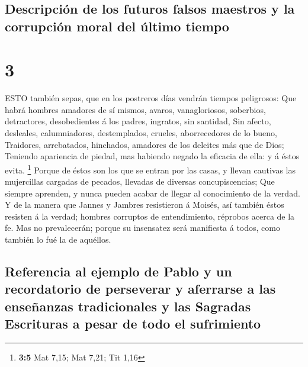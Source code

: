\hypertarget{descripciuxf3n-de-los-futuros-falsos-maestros-y-la-corrupciuxf3n-moral-del-uxfaltimo-tiempo}{%
\subsection{Descripción de los futuros falsos maestros y la corrupción
moral del último
tiempo}\label{descripciuxf3n-de-los-futuros-falsos-maestros-y-la-corrupciuxf3n-moral-del-uxfaltimo-tiempo}}

\hypertarget{section-2}{%
\section{3}\label{section-2}}

 ESTO también sepas, que en los postreros días vendrán
tiempos peligrosos:  Que habrá hombres amadores de sí
mismos, avaros, vanagloriosos, soberbios, detractores, desobedientes á
los padres, ingratos, sin santidad,  Sin afecto, desleales,
calumniadores, destemplados, crueles, aborrecedores de lo bueno,
 Traidores, arrebatados, hinchados, amadores de los deleites
más que de Dios;  Teniendo apariencia de piedad, mas
habiendo negado la eficacia de ella: y á éstos evita. \footnote{\textbf{3:5}
  Mat 7,15; Mat 7,21; Tit 1,16}  Porque de éstos son los que
se entran por las casas, y llevan cautivas las mujercillas cargadas de
pecados, llevadas de diversas concupiscencias;  Que siempre
aprenden, y nunca pueden acabar de llegar al conocimiento de la verdad.
 Y de la manera que Jannes y Jambres resistieron á Moisés,
así también éstos resisten á la verdad; hombres corruptos de
entendimiento, réprobos acerca de la fe.  Mas no
prevalecerán; porque su insensatez será manifiesta á todos, como también
lo fué la de aquéllos.

\hypertarget{referencia-al-ejemplo-de-pablo-y-un-recordatorio-de-perseverar-y-aferrarse-a-las-enseuxf1anzas-tradicionales-y-las-sagradas-escrituras-a-pesar-de-todo-el-sufrimiento}{%
\subsection{Referencia al ejemplo de Pablo y un recordatorio de
perseverar y aferrarse a las enseñanzas tradicionales y las Sagradas
Escrituras a pesar de todo el
sufrimiento}\label{referencia-al-ejemplo-de-pablo-y-un-recordatorio-de-perseverar-y-aferrarse-a-las-enseuxf1anzas-tradicionales-y-las-sagradas-escrituras-a-pesar-de-todo-el-sufrimiento}}


